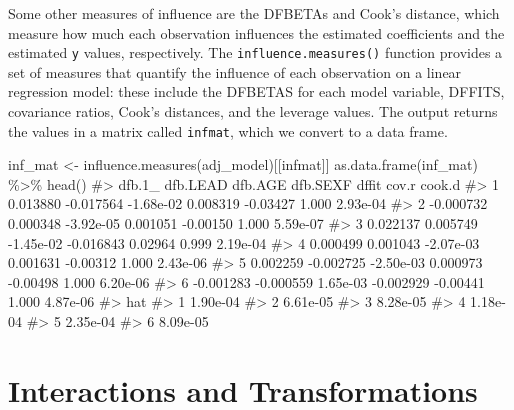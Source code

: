 \documentclass[
  letterpaper,
]{latex/krantz}
\makeatletter
\newenvironment{Shaded}{\begin{snugshade}}{\end{snugshade}}
\newcommand{\CommentTok}[1]{\textcolor[rgb]{0.37,0.37,0.37}{#1}}
\newcommand{\FunctionTok}[1]{\textcolor[rgb]{0.28,0.35,0.67}{#1}}
\newcommand{\NormalTok}[1]{\textcolor[rgb]{0.00,0.23,0.31}{#1}}
\newcommand{\OtherTok}[1]{\textcolor[rgb]{0.00,0.23,0.31}{#1}}
\newcommand{\SpecialCharTok}[1]{\textcolor[rgb]{0.37,0.37,0.37}{#1}}
\newcommand{\StringTok}[1]{\textcolor[rgb]{0.13,0.47,0.30}{#1}}
\newenvironment{kframe}{%
\medskip{}
\setlength{\fboxsep}{.8em}
 \def\at@end@of@kframe{}%
 \ifinner\ifhmode%
  \def\at@end@of@kframe{\end{minipage}}%
  \begin{minipage}{\columnwidth}%
 \fi\fi%
 \def\FrameCommand##1{\hskip\@totalleftmargin \hskip-\fboxsep
 \colorbox{shadecolor}{##1}\hskip-\fboxsep
     \hskip-\linewidth \hskip-\@totalleftmargin \hskip\columnwidth}%
 \MakeFramed {\advance\hsize-\width
   \@totalleftmargin\z@ \linewidth\hsize
   \@setminipage}}%
 {\par\unskip\endMakeFramed%
 \at@end@of@kframe}
\renewenvironment{Shaded}{\begin{kframe}}{\end{kframe}}
\makeatother
\begin{document}
Some other measures of influence are the DFBETAs and Cook's distance,
which measure how much each observation influences the estimated
coefficients and the estimated \texttt{y} values, respectively. The
\texttt{influence.measures()}
function provides a set of measures that quantify the influence of each
observation on a linear regression model: these include the DFBETAS for
each model variable, DFFITS, covariance ratios, Cook's distances, and
the leverage values. The output returns the values in a matrix called
\texttt{infmat}, which we convert to a data frame.

\begin{Shaded}
\begin{Highlighting}[]
\NormalTok{inf\_mat }\OtherTok{\textless{}{-}} \FunctionTok{influence.measures}\NormalTok{(adj\_model)[[}\StringTok{\textquotesingle{}infmat\textquotesingle{}}\NormalTok{]]}
\FunctionTok{as.data.frame}\NormalTok{(inf\_mat) }\SpecialCharTok{\%\textgreater{}\%} \FunctionTok{head}\NormalTok{()}
\CommentTok{\#\textgreater{}      dfb.1\_  dfb.LEAD   dfb.AGE  dfb.SEXF    dffit cov.r   cook.d}
\CommentTok{\#\textgreater{} 1  0.013880 {-}0.017564 {-}1.68e{-}02  0.008319 {-}0.03427 1.000 2.93e{-}04}
\CommentTok{\#\textgreater{} 2 {-}0.000732  0.000348 {-}3.92e{-}05  0.001051 {-}0.00150 1.000 5.59e{-}07}
\CommentTok{\#\textgreater{} 3  0.022137  0.005749 {-}1.45e{-}02 {-}0.016843  0.02964 0.999 2.19e{-}04}
\CommentTok{\#\textgreater{} 4  0.000499  0.001043 {-}2.07e{-}03  0.001631 {-}0.00312 1.000 2.43e{-}06}
\CommentTok{\#\textgreater{} 5  0.002259 {-}0.002725 {-}2.50e{-}03  0.000973 {-}0.00498 1.000 6.20e{-}06}
\CommentTok{\#\textgreater{} 6 {-}0.001283 {-}0.000559  1.65e{-}03 {-}0.002929 {-}0.00441 1.000 4.87e{-}06}
\CommentTok{\#\textgreater{}        hat}
\CommentTok{\#\textgreater{} 1 1.90e{-}04}
\CommentTok{\#\textgreater{} 2 6.61e{-}05}
\CommentTok{\#\textgreater{} 3 8.28e{-}05}
\CommentTok{\#\textgreater{} 4 1.18e{-}04}
\CommentTok{\#\textgreater{} 5 2.35e{-}04}
\CommentTok{\#\textgreater{} 6 8.09e{-}05}
\end{Highlighting}
\end{Shaded}

\section{\texorpdfstring{Interactions and Transformations
}{Interactions and Transformations  }}\label{interactions-and-transformations}
\end{document}

